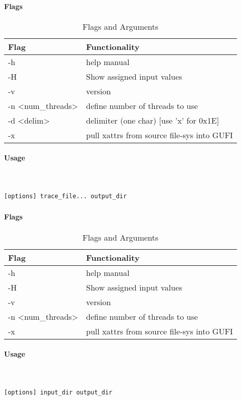 \paragraph{Flags}
\begin{table} [H]
  \centering
  \begin{tabular}{l|l}
    Flag & Functionality \\
    \hline
    -h & help manual \\
    \hline
    -H & Show assigned input values \\
    \hline
    -v & version \\
    \hline
    -n \textless num\_threads\textgreater & define number of threads to use \\
    \hline
    -d \textless delim\textgreater & delimiter (one char)  [use 'x' for 0x1E] \\
    \hline
    -x & pull xattrs from source file-sys into GUFI \\
    \hline
  \end{tabular}
  \caption{\gufitracedir Flags and Arguments}
\end{table}

\paragraph{Usage} ~\\\\
\gufitracedir \texttt{[options] trace\_file... output\_dir}

\subsubsection{\gufiindexdir}
\paragraph{Flags}
\begin{table} [H]
  \centering
  \begin{tabular}{l|l}
    Flag & Functionality \\
    \hline
    -h & help manual \\
    \hline
    -H & Show assigned input values \\
    \hline
    -v & version \\
    \hline
    -n \textless num\_threads\textgreater & define number of threads to use \\
    \hline
    -x & pull xattrs from source file-sys into GUFI \\
    \hline
  \end{tabular}
  \caption{\gufiindexdir Flags and Arguments}
\end{table}

\paragraph{Usage} ~\\\\
\gufiindexdir \texttt{[options] input\_dir output\_dir}
